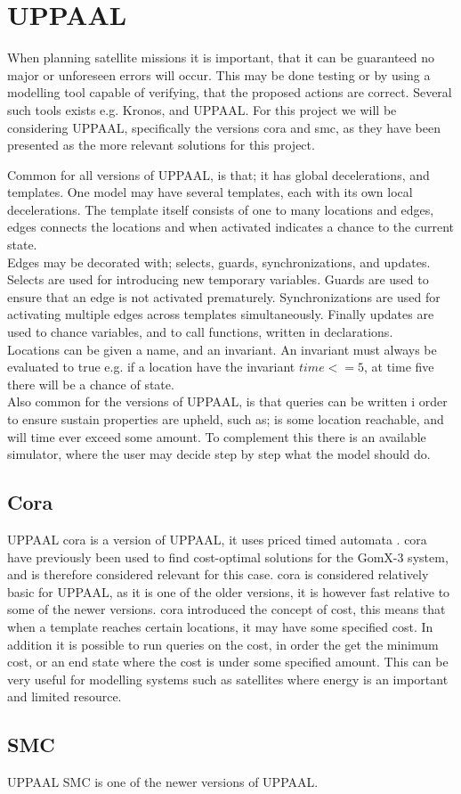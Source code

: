 \section{UPPAAL}
When planning satellite missions it is important, that it can be guaranteed no major or unforeseen errors will occur. This may be done testing or by using a modelling tool capable of verifying, that the proposed actions are correct\cite{cs_smc}. Several such tools exists e.g. Kronos, and UPPAAL. For this project we will be considering UPPAAL, specifically the versions \gls{cora} and \gls{smc}, as they have been presented as the more relevant solutions for this project.

Common for all versions of UPPAAL, is that; it has global decelerations, and templates. One model may have several templates, each with its own local decelerations. The template itself consists of one to many locations and edges, edges connects the locations and when activated indicates a chance to the current state.\\
Edges may be decorated with; selects, guards, synchronizations, and updates. Selects are used for introducing new temporary variables. Guards are used to ensure that an edge is not activated prematurely. Synchronizations are used for activating multiple edges across templates simultaneously. Finally updates are used to chance variables, and to call functions, written in declarations.\\
Locations can be given a name, and an invariant. An invariant must always be evaluated to true e.g. if a location have the invariant $time <= 5$, at time five there will be a chance of state.\\
Also common for the versions of UPPAAL, is that queries can be written i order to ensure sustain properties are upheld, such as; is some location reachable, and will time ever exceed some amount. To complement this there is an available simulator, where the user may decide step by step what the model should do.


\subsection{Cora}
UPPAAL \gls{cora} is a version of UPPAAL, it uses priced timed automata \cite{cs_cora}. \Gls{cora} have previously been used to find cost-optimal solutions for the GomX-3 system\cite{gomx3}, and is therefore considered relevant for this case.
\Gls{cora} is considered relatively basic for UPPAAL, as it is one of the older versions, it is however fast relative to some of the newer versions. \Gls{cora} introduced the concept of cost, this means that when a template reaches certain locations, it may have some specified cost. In addition it is possible to run queries on the cost, in order the get the minimum cost, or an end state where the cost is under some specified amount.
This can be very useful for modelling systems such as satellites where energy is an important and limited resource.

\subsection{SMC}
UPPAAL SMC is one of the newer versions of UPPAAL.


